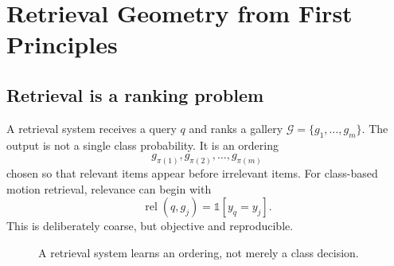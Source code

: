 \documentclass[11pt,oneside,openany]{book}
\theoremstyle{myplain}
\theoremstyle{definition}
\newcommand{\ind}{\mathds{1}}
\begin{document}
\tableofcontents
\listoffigures

\mainmatter

\chapter{Retrieval Geometry from First Principles}
\label{chap:geometry}

\section{Retrieval is a ranking problem}

A retrieval system receives a query $q$ and ranks a gallery $\mathcal G=\{g_1,\dots,g_m\}$. The output is not a single class probability. It is an ordering
\[
  g_{\pi(1)},g_{\pi(2)},\dots,g_{\pi(m)}
\]
chosen so that relevant items appear before irrelevant items. For class-based motion retrieval, relevance can begin with
\[
  \operatorname{rel}(q,g_j)=\ind[y_q=y_j].
\]
This is deliberately coarse, but objective and reproducible.

\begin{figure}[H]
\centering
{}
\caption{A retrieval system learns an ordering, not merely a class decision.}
\label{fig:retrieval}
\end{figure}
\end{document}
